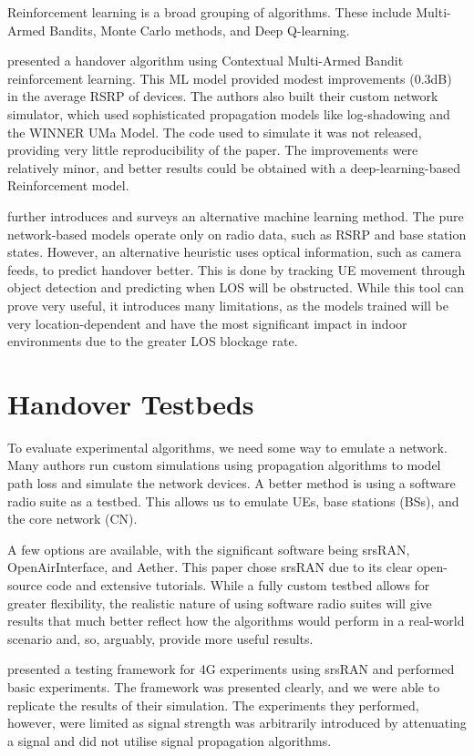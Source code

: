 Reinforcement learning is a broad grouping of algorithms. These include Multi-Armed Bandits, Monte Carlo methods, and Deep Q-learning.

\citet{yajnanarayana_5g_2020} presented a handover algorithm using Contextual Multi-Armed Bandit reinforcement learning. This ML model provided modest improvements (0.3dB) in the average RSRP of devices. The authors also built their custom network simulator, which used sophisticated propagation models like log-shadowing and the WINNER UMa Model. The code used to simulate it was not released, providing very little reproducibility of the paper. The improvements were relatively minor, and better results could be obtained with a deep-learning-based Reinforcement model.

\citet{mollel_survey_2021} further introduces and surveys an alternative machine learning method. The pure network-based models operate only on radio data, such as RSRP and base station states. However, an alternative heuristic uses optical information, such as camera feeds, to predict handover better. This is done by tracking UE movement through object detection and predicting when LOS will be obstructed. While this tool can prove very useful, it introduces many limitations, as the models trained will be very location-dependent and have the most significant impact in indoor environments due to the greater LOS blockage rate.

\section{Handover Testbeds}
To evaluate experimental algorithms, we need some way to emulate a network. Many authors run custom simulations using propagation algorithms to model path loss and simulate the network devices. A better method is using a software radio suite as a testbed. This allows us to emulate UEs, base stations (BSs), and the core network (CN).

A few options are available, with the significant software being srsRAN, OpenAirInterface, and Aether. This paper chose srsRAN due to its clear open-source code and extensive tutorials. While a fully custom testbed allows for greater flexibility, the realistic nature of using software radio suites will give results that much better reflect how the algorithms would perform in a real-world scenario and, so, arguably, provide more useful results.

\citet{powell_handover_2021} presented a testing framework for 4G experiments using srsRAN and performed basic experiments. The framework was presented clearly, and we were able to replicate the results of their simulation. The experiments they performed, however, were limited as signal strength was arbitrarily introduced by attenuating a signal and did not utilise signal propagation algorithms.

